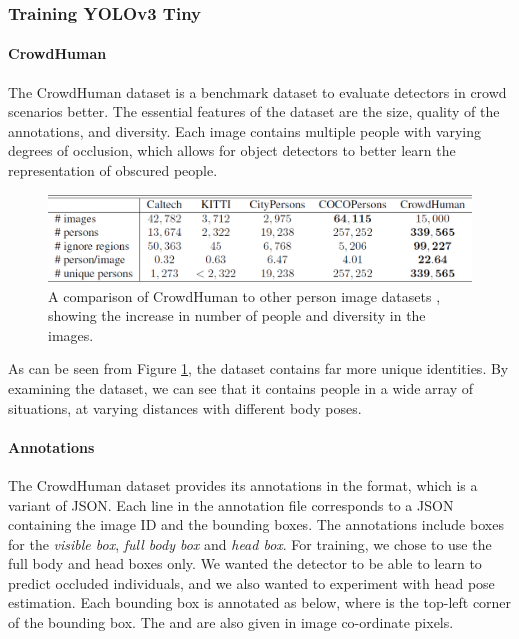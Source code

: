 \subsubsection{Training YOLOv3 Tiny}
\paragraph{CrowdHuman} The CrowdHuman dataset \cite{Shao} is a benchmark dataset to evaluate detectors in crowd scenarios better. The essential features of the dataset are the size, quality of the annotations, and diversity. Each image contains multiple people with varying degrees of occlusion, which allows for object detectors to better learn the representation of obscured people. 

\begin{figure}[ht]
    \centering
    \includegraphics[width=0.9\linewidth]{img/chapter5_implementation/crowdHumanStats.png}
    \caption{A comparison of CrowdHuman to other person image datasets \cite{Shao}, showing the increase in number of people and diversity in the images.}
    \label{fig:crowdHumanStats}
\end{figure}

As can be seen from Figure \ref{fig:crowdHumanStats}, the dataset contains far more unique identities. By examining the dataset, we can see that it contains people in a wide array of situations, at varying distances with different body poses.

\paragraph{Annotations} The CrowdHuman dataset provides its annotations in the  format, which is a variant of JSON. Each line in the annotation file corresponds to a JSON containing the image ID and the bounding boxes. The annotations include boxes for the \textit{visible box}, \textit{full body box} and \textit{head box}. For training, we chose to use the full body and head boxes only. We wanted the detector to be able to learn to predict occluded individuals, and we also wanted to experiment with head pose estimation. Each bounding box is annotated as below, where  is the top-left corner of the bounding box. The  and  are also given in image co-ordinate pixels.

